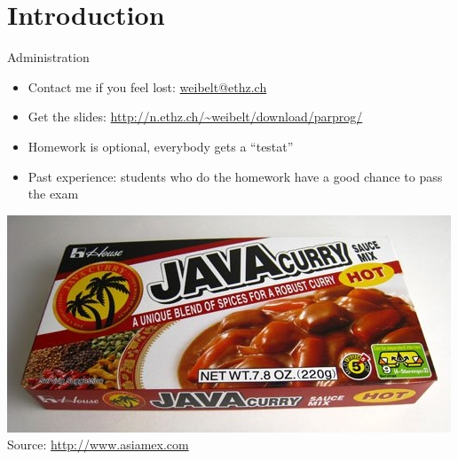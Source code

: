 \section*{Introduction}

\begin{frame}{Administration}
  \begin{itemize}
  \item Contact me if you feel lost: \url{weibelt@ethz.ch}
  \item Get the slides:
    \url{http://n.ethz.ch/~weibelt/download/parprog/}
  \item Homework is optional, everybody gets a ``testat''
  \item Past experience: students who do the homework have a good
    chance to pass the exam
  \end{itemize}


  \begin{center}
    \includegraphics[scale=0.6]{figures/java} \\
    \tiny{Source: \url{http://www.asiamex.com}}
  \end{center}
\end{frame}

